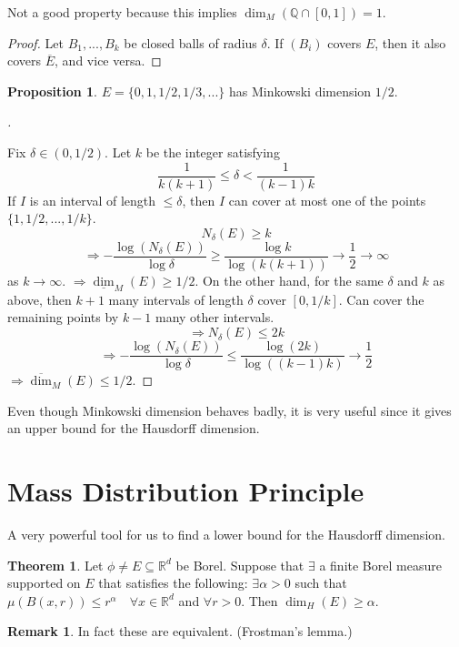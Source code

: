 \documentclass{article}
\theoremstyle{definition}
\newtheorem{thm}{Theorem}
\newtheorem{rem}{Remark}
\newtheorem{prop}{Proposition}
\newenvironment{proofs}[1][\proofname]{%
  \begin{proof}[#1]$ $\par\nobreak\ignorespaces
}{%
  \end{proof}
}
\newcommand{\QQ}{\mathbb Q}
\newcommand{\RR}{\mathbb R}
\newcommand{\Ra}{\Rightarrow}
\begin{document}
Not a good property because this implies $\dim_M(\QQ \cap [0, 1]) = 1$.

\begin{proof}
	Let $B_1, ..., B_k$ be closed balls of radius $\delta$.
	If $(B_i)$ covers $E$, then it also covers $\overline{E}$, and vice versa.
\end{proof}

\begin{prop}
	$E = \{0, 1, 1/2, 1/3, ...\}$ has Minkowski dimension $1/2$.
\end{prop}

\begin{proofs}
	Fix $\delta \in (0, 1/2)$.
	Let $k$ be the integer satisfying 
	\[
		\frac{1}{k(k + 1)} \leq \delta < \frac{1}{(k - 1)k}
	\]
	If $I$ is an interval of length $\leq \delta$, then $I$ can cover at most one of the points $\{1, 1/2, ..., 1/k\}$.
	\[
		N_\delta(E) \geq k
	\]
	\[
		\Ra -\frac{\log (N_\delta(E))}{\log \delta} \geq \frac{\log k}{\log (k (k + 1))} \to \frac{1}{2} \to \infty
	\]
	as $k \to \infty$.
	$\Ra \underline{\dim}_M(E) \geq 1/2$.
	On the other hand, for the same $\delta$ and $k$ as above, then $k + 1$ many intervals of length $\delta$ cover $[0, 1/k]$.
	Can cover the remaining points by $k - 1$ many other intervals.
	\[
		\Ra N_\delta(E) \leq 2 k
	\]
	\[
		\Ra -\frac{\log (N_\delta(E))}{\log \delta} \leq \frac{\log(2k)}{\log ((k - 1) k)} \to \frac{1}{2}
	\]
	$\Ra \overline{\dim}_M(E) \leq 1/2$.
\end{proofs}

Even though Minkowski dimension behaves badly, it is very useful since it gives an upper bound for the Hausdorff dimension.

\section{Mass Distribution Principle}

A very powerful tool for us to find a lower bound for the Hausdorff dimension.

\begin{thm}
	Let $\phi \neq E \subseteq \RR^d$ be Borel.
	Suppose that $\exists$ a finite Borel measure supported on $E$ that satisfies the following:
	$\exists \alpha > 0$ such that $\mu(B(x, r)) \leq r^\alpha \quad \forall x \in \RR^d$ and $\forall r > 0$.
	Then $\dim_H(E) \geq \alpha$.
\end{thm}

\begin{rem}
	In fact these are equivalent. (Frostman's lemma.)
\end{rem}
\end{document}
